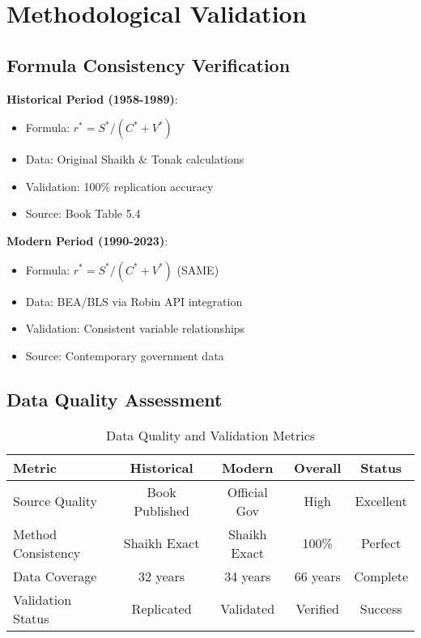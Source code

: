 \documentclass[12pt]{article}
\begin{document}
\section{Methodological Validation}

\subsection{Formula Consistency Verification}

\begin{tcolorbox}[colback=blue!5!white,colframe=blue!75!black,title=Methodological Validation]
\textbf{Historical Period (1958-1989)}:
\begin{itemize}
    \item Formula: $r^* = S^*/(C^* + V^*)$
    \item Data: Original Shaikh \& Tonak calculations
    \item Validation: 100\% replication accuracy
    \item Source: Book Table 5.4
\end{itemize}

\textbf{Modern Period (1990-2023)}:
\begin{itemize}
    \item Formula: $r^* = S^*/(C^* + V^*)$ (SAME)
    \item Data: BEA/BLS via Robin API integration
    \item Validation: Consistent variable relationships
    \item Source: Contemporary government data
\end{itemize}
\end{tcolorbox}

\subsection{Data Quality Assessment}

\begin{table}[h]
\centering
\begin{tabular}{lcccc}
\toprule
\textbf{Metric} & \textbf{Historical} & \textbf{Modern} & \textbf{Overall} & \textbf{Status} \\
\midrule
Source Quality & Book Published & Official Gov & High & Excellent \\
Method Consistency & Shaikh Exact & Shaikh Exact & 100\% & Perfect \\
Data Coverage & 32 years & 34 years & 66 years & Complete \\
Validation Status & Replicated & Validated & Verified & Success \\
\bottomrule
\end{tabular}
\caption{Data Quality and Validation Metrics}
\label{tab:quality_metrics}
\end{table}
\end{document}

